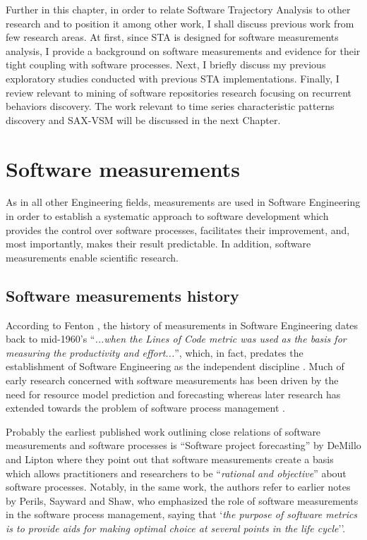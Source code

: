 Further in this chapter, in order to relate Software Trajectory Analysis to other research and to position it among 
other work, I shall discuss previous work from few research areas.
At first, since STA is designed for software measurements analysis, I provide a background on software 
measurements and evidence for their tight coupling with software processes. 
Next, I briefly discuss my previous exploratory studies conducted with previous STA implementations. 
Finally, I review relevant to mining of software repositories research focusing on recurrent behaviors discovery.
The work relevant to time series characteristic patterns discovery and SAX-VSM will be discussed in the next Chapter.

\section{Software measurements}
As in all other Engineering fields, measurements are used in Software Engineering in order to establish a 
systematic approach to software development which provides the control over software processes, facilitates
their improvement, and, most importantly, makes their result predictable. 
In addition, software measurements enable scientific research.

\subsection{Software measurements history}
According to Fenton \cite{citeulike:1525462}, the history of measurements in Software Engineering dates 
back to mid-1960's  ``\textit{...when the Lines of Code metric was used as the basis for measuring the 
productivity and effort...}'', which, in fact, predates the establishment of Software Engineering as the 
independent discipline \cite{naur_crisis_68}. 
Much of early research concerned with software measurements has been driven by the need for resource model 
prediction and forecasting \cite{citeulike:1525462} whereas later research has extended towards the problem 
of software process management \cite{citeulike:13158802}.

Probably the earliest published work outlining close relations of software measurements and software 
processes is ``Software project forecasting'' by DeMillo and Lipton \cite{demillo1980software} where they 
point out that software measurements create a basis which allows practitioners and researchers to be 
``\textit{rational and objective}'' about software processes. 
Notably, in the same work, the authors refer to earlier notes by Perils, Sayward and Shaw, who emphasized 
the role of software measurements in the software process management, saying that `\textit{the purpose of 
software metrics is to provide aids for making optimal choice at several points in the life cycle}''.

